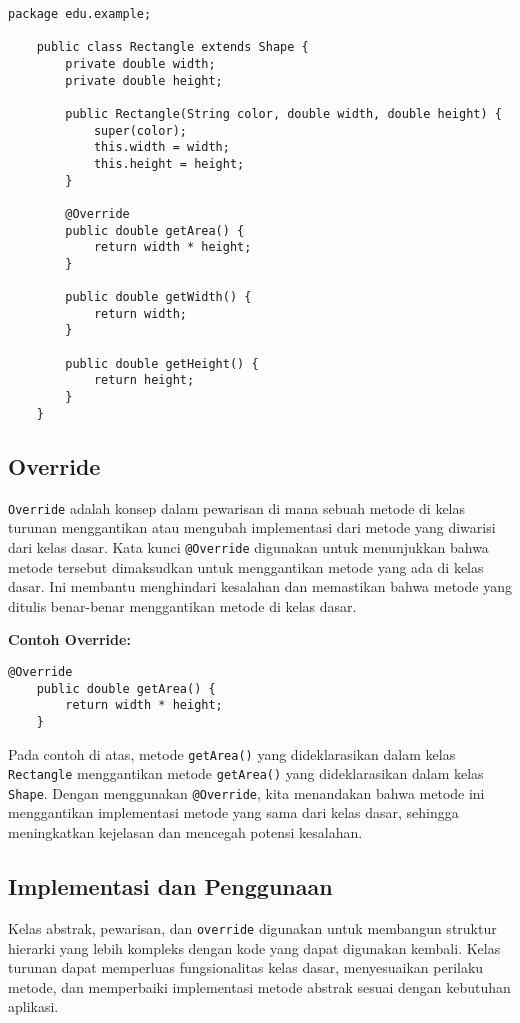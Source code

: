 \begin{lstlisting}[style=JavaStyle]
	package edu.example;
	
	public class Rectangle extends Shape {
		private double width;
		private double height;
		
		public Rectangle(String color, double width, double height) {
			super(color);
			this.width = width;
			this.height = height;
		}
		
		@Override
		public double getArea() {
			return width * height;
		}
		
		public double getWidth() {
			return width;
		}
		
		public double getHeight() {
			return height;
		}
	}
\end{lstlisting}

\subsection{Override}

\texttt{Override} adalah konsep dalam pewarisan di mana sebuah metode di kelas turunan menggantikan atau mengubah implementasi dari metode yang diwarisi dari kelas dasar. Kata kunci \texttt{@Override} digunakan untuk menunjukkan bahwa metode tersebut dimaksudkan untuk menggantikan metode yang ada di kelas dasar. Ini membantu menghindari kesalahan dan memastikan bahwa metode yang ditulis benar-benar menggantikan metode di kelas dasar.

\textbf{Contoh Override:}

\begin{lstlisting}[style=JavaStyle]
	@Override
	public double getArea() {
		return width * height;
	}
\end{lstlisting}

Pada contoh di atas, metode \texttt{getArea()} yang dideklarasikan dalam kelas \texttt{Rectangle} menggantikan metode \texttt{getArea()} yang dideklarasikan dalam kelas \texttt{Shape}. Dengan menggunakan \texttt{@Override}, kita menandakan bahwa metode ini menggantikan implementasi metode yang sama dari kelas dasar, sehingga meningkatkan kejelasan dan mencegah potensi kesalahan.

\subsection{Implementasi dan Penggunaan}

Kelas abstrak, pewarisan, dan \texttt{override} digunakan untuk membangun struktur hierarki yang lebih kompleks dengan kode yang dapat digunakan kembali. Kelas turunan dapat memperluas fungsionalitas kelas dasar, menyesuaikan perilaku metode, dan memperbaiki implementasi metode abstrak sesuai dengan kebutuhan aplikasi.

